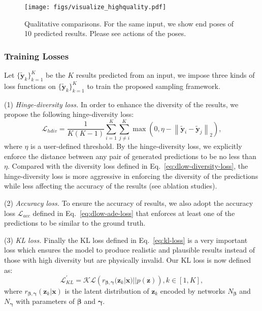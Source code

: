 \documentclass[sigconf,screen,nonacm]{acmart}
\begin{document}
	
\begin{figure*}[!t]
		\centering
		\texttt{[image: figs/visualize\_highquality.pdf]}
		\caption{Qualitative comparisons. For the same input, we show end poses of 10 predicted results. Please see actions of the poses.}
		\label{fig:quality_visualize}
	\end{figure*}
	
	\subsubsection{Training Losses} 
	Let $\{\mathbf{\tilde{y}}_k\}_{k=1}^K$ be the $K$ results predicted from an input, we impose three kinds of loss functions on $\{\mathbf{\tilde{y}}_k\}_{k=1}^K$ to train the proposed sampling framework.


	(1) \textit{Hinge-diversity loss.} In order to enhance the diversity of the results, we propose the following hinge-diversity loss:
	\begin{equation}
		\mathcal{L}_{hdiv} = \frac{1}{K(K-1)} \sum_{i=1}^{K} \sum_{j\neq i}^{K} \max \left( 0, \eta -  \left\| \mathbf{\tilde{y}}_i - \mathbf{\tilde{y}}_j \right\|_2 \right),
		\label{equ:hinge_loss}
	\end{equation}
	where $\eta$ is a user-defined threshold. By the hinge-diversity loss, we explicitly enforce the distance between any pair of generated predictions to be no less than $\eta$. Compared with the diversity loss defined in Eq.~\ref{eq:dlow-diversity-loss}, the hinge-diversity loss is more aggressive in enforcing the diversity of the predictions while less affecting the accuracy of the results (see ablation studies).
	
	(2) \textit{Accuracy loss.} To ensure the accuracy of results, we also adopt the accuracy loss $\mathcal{L}_{acc}$ defined in Eq.~\ref{eq:dlow-ade-loss} that enforces at least one of the predictions to be similar to the ground truth. 
	
	(3) \textit{KL loss.} Finally the KL loss defined in Eq.~\ref{eq:kl-loss} is a very important loss which ensures the model to produce realistic and plausible results instead of those with high diversity but are physically invalid. Our KL loss is now defined as:
	\begin{equation}
		\mathcal{L}^\prime_{KL} = \mathcal{KL} \left(r_{\bm{\beta},\bm{\gamma}}(\mathbf{z}_k|\mathbf{x})||p(\mathbf{z})\right), k\in[1,K],
	\end{equation}
	where $r_{\bm{\beta},\bm{\gamma}}(\mathbf{z}_k|\mathbf{x})$ is the latent distribution of $\mathbf{z}_k$ encoded by networks $N_{\bm{\beta}}$ and $N_{\bm{\gamma}}$ with parameters of $\bm{\beta}$ and $\bm{\gamma}$. 
	
\end{document}
